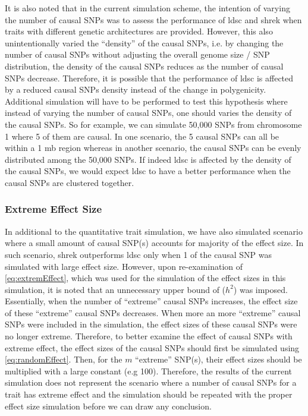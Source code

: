 \documentclass[12pt]{scrbook}
\begin{document}
It is also noted that in the current simulation scheme, the intention of varying the number of causal \glspl{SNP} was to assess the performance of \gls{ldsc} and \gls{shrek} when traits with different genetic architectures are provided. 
However, this also unintentionally varied the ``density'' of the causal \glspl{SNP}, i.e. by changing the number of causal \glspl{SNP} without adjusting the overall genome size / \gls{SNP} distribution, the density of the causal \glspl{SNP} reduces as the number of causal \glspl{SNP} decrease.
Therefore, it is possible that the performance of \gls{ldsc} is affected by a reduced causal \glspl{SNP} density instead of the change in polygenicity. 
Additional simulation will have to be performed to test this hypothesis where instead of varying the number of causal \glspl{SNP}, one should varies the density of the causal \glspl{SNP}.
So for example, we can simulate 50,000 \glspl{SNP} from chromosome 1 where 5 of them are causal. 
In one scenario, the 5 causal \glspl{SNP} can all be within a 1 \gls{mb} region whereas in another scenario, the causal \glspl{SNP} can be evenly distributed among the 50,000 \glspl{SNP}. 
If indeed \gls{ldsc} is affected by the density of the causal \glspl{SNP}, we would expect \gls{ldsc} to have a better performance when the causal \glspl{SNP} are clustered together. 

\subsubsection{Extreme Effect Size}
In additional to the quantitative trait simulation, we have also simulated scenario where a small amount of causal \gls{SNP}(s) accounts for majority of the effect size. 
In such scenario, \gls{shrek} outperforms \gls{ldsc} only when 1 of the causal \gls{SNP} was simulated with large effect size. 
However, upon re-examination of \cref{eq:extremEffect}, which was used for the simulation of the effect sizes in this simulation, it is noted that an unnecessary upper bound of ($h^2$) was imposed.
Essentially, when the number of ``extreme'' causal \glspl{SNP} increases, the effect size of these ``extreme'' causal \glspl{SNP} decreases. 
When more an more ``extreme'' causal \glspl{SNP} were included in the simulation, the effect sizes of these causal \glspl{SNP} were no longer extreme. 
Therefore, to better examine the effect of causal \glspl{SNP} with extreme effect, the effect sizes of the causal \glspl{SNP} should first be simulated using \cref{eq:randomEffect}.
Then, for the $m$ ``extreme'' \gls{SNP}(s), their effect sizes should be multiplied with a large constant (e.g 100).
Therefore, the results of the current simulation does not represent the scenario where a number of causal \glspl{SNP} for a trait has extreme effect and the simulation should be repeated with the proper effect size simulation before we can draw any conclusion.
\end{document}
